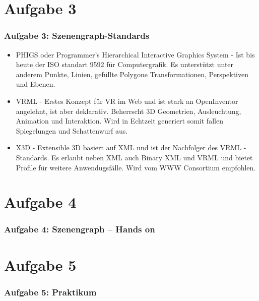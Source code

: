 \documentclass[accentcolor=tud9c,colorbacktitle,inverttitle,landscape,german,presentation,t]{tudbeamer}
\begin{document}
\section{Aufgabe 3}
\begin{frame}
	\frametitle{Aufgabe 3: Szenengraph-Standards}
			\begin{itemize}
			\item PHIGS oder Programmer’s Hierarchical Interactive Graphics System - Ist bis heute der ISO standart 9592 für Computergrafik. Es unterstützt unter anderem Punkte, Linien, gefüllte Polygone Transformationen, Perspektiven und Ebenen.
			\item VRML - Erstes Konzept für VR im Web und ist stark an OpenInventor angelehnt, ist aber deklarativ. Beherrscht 3D Geometrien, Ausleuchtung, Animation und Interaktion. Wird in Echtzeit generiert somit fallen Spiegelungen und Schattenwurf aus.
			\item X3D - Extensible 3D basiert auf XML und ist der Nachfolger des VRML - Standards. Es erlaubt neben XML auch Binary XML und VRML und bietet Profile für weitere Anwendugsfälle. Wird vom WWW Consortium empfohlen.
		\end{itemize}
\end{frame}

\section{Aufgabe 4}
\begin{frame}
	\frametitle{Aufgabe 4: Szenengraph – Hands on}
\end{frame}

\section{Aufgabe 5}
\begin{frame}
	\frametitle{Aufgabe 5: Praktikum}
\end{frame}
\end{document}

